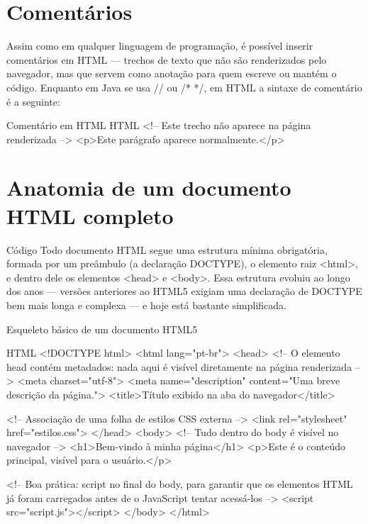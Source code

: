 \section{Comentários}

Assim como em qualquer linguagem de programação, é possível inserir comentários em HTML — trechos de texto que não são renderizados pelo navegador, mas que servem como anotação para quem escreve ou mantém o código. Enquanto em Java se usa // ou /* */, em HTML a sintaxe de comentário é a seguinte:

\begin{codebox}{Comentário em HTML}
HTML
<!-- Este trecho não aparece na página renderizada -->
<p>Este parágrafo aparece normalmente.</p>
\end{codebox}

\section{Anatomia de um documento HTML completo}

\begin{codebox}{Código}
Todo documento HTML segue uma estrutura mínima obrigatória, formada por um
preâmbulo (a declaração DOCTYPE), o elemento raiz <html>, e dentro dele os elementos
<head> e <body>. Essa estrutura evoluiu ao longo dos anos — versões anteriores ao
HTML5 exigiam uma declaração de DOCTYPE bem mais longa e complexa — e hoje
está bastante simplificada.
\end{codebox}

Esqueleto básico de um documento HTML5

\begin{codebox}{HTML}
  <!DOCTYPE html>
  <html lang="pt-br">
    <head>
      <!-- O elemento head contém metadados: nada aqui é
           visível diretamente na página renderizada -->
      <meta charset="utf-8">
      <meta name="description" content="Uma breve descrição da página.">
      <title>Título exibido na aba do navegador</title>

      <!-- Associação de uma folha de estilos CSS externa -->
      <link rel="stylesheet" href="estilos.css">
    </head>
    <body>
      <!-- Tudo dentro do body é visível no navegador -->
      <h1>Bem-vindo à minha página</h1>
      <p>Este é o conteúdo principal, visível para o usuário.</p>

      <!-- Boa prática: script no final do body, para garantir
            que os elementos HTML já foram carregados antes de
            o JavaScript tentar acessá-los -->
      <script src="script.js"></script>
    </body>
  </html>
\end{codebox}

